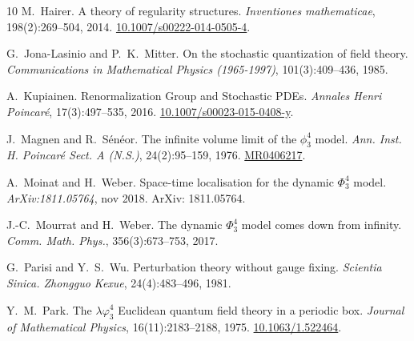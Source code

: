 \documentclass[11pt]{article}
\newcommand{\tmtextit}[1]{{\itshape{#1}}}
\begin{document}
\begin{thebibliography}{10}
  M.~Hairer. {\newblock}A theory of regularity
  structures. {\newblock}\tmtextit{Inventiones mathematicae}, 198(2):269--504,
  2014.
  {\newblock}\href{Https://doi.org/10.1007/s00222-014-0505-4}{10.1007/s00222-014-0505-4}.{\newblock}
  
  G.~Jona-Lasinio  and 
  P.~K.~Mitter. {\newblock}On the stochastic quantization of field theory.
  {\newblock}\tmtextit{Communications in Mathematical Physics (1965-1997)},
  101(3):409--436, 1985.{\newblock}
  
  A.~Kupiainen.
  {\newblock}Renormalization Group and Stochastic PDEs.
  {\newblock}\tmtextit{Annales Henri Poincar{\'e}}, 17(3):497--535, 2016.
  {\newblock}\href{Https://doi.org/10.1007/s00023-015-0408-y}{10.1007/s00023-015-0408-y}.{\newblock}
  
  J.~Magnen  and  R.~S{\'e}n{\'e}or.
  {\newblock}The infinite volume limit of the $\phi^4_3$ model.
  {\newblock}\tmtextit{Ann. Inst. H. Poincar{\'e} Sect. A (N.S.)},
  24(2):95--159, 1976.
  {\newblock}\href{Https://mathscinet.ams.org/mathscinet-getitem?mr=0406217}{MR0406217}.{\newblock}
  
  A.~Moinat  and  H.~Weber.
  {\newblock}Space-time localisation for the dynamic $\Phi^4_3$ model.
  {\newblock}\tmtextit{ArXiv:1811.05764}, nov 2018. {\newblock}ArXiv:
  1811.05764.{\newblock}
  
  J.-C.~Mourrat  and  H.~Weber. {\newblock}The dynamic
  $\Phi^4_3$ model comes down from infinity. {\newblock}\tmtextit{Comm. Math.
  Phys.}, 356(3):673--753, 2017.{\newblock}
  
  G.~Parisi  and  Y.~S.~Wu.
  {\newblock}Perturbation theory without gauge fixing.
  {\newblock}\tmtextit{Scientia Sinica. Zhongguo Kexue}, 24(4):483--496,
  1981.{\newblock}
  
  Y.~M.~Park. {\newblock}The $\lambda
  \varphi^4_3$ Euclidean quantum field theory in a periodic box.
  {\newblock}\tmtextit{Journal of Mathematical Physics}, 16(11):2183--2188,
  1975.
  {\newblock}\href{Https://doi.org/10.1063/1.522464}{10.1063/1.522464}.{\newblock}
\end{thebibliography}

\

\
\end{document}
